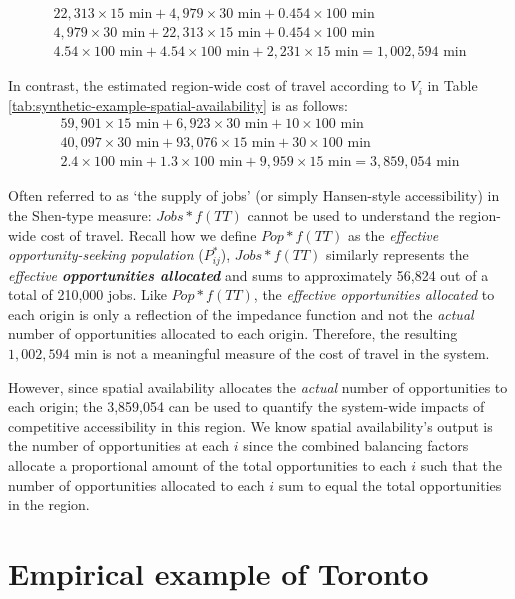\documentclass[]{elsarticle} %
\begin{document}
\[
\begin{array}{l}
22,313\times 15 \text{ min} + 4,979\times 30 \text{ min} + 0.454\times 100 \text{ min}\\
4,979\times 30 \text{ min} + 22,313\times 15 \text{ min} + 0.454\times 100 \text{ min}\\
4.54\times 100 \text{ min} + 4.54\times 100 \text{ min} + 2,231\times 15 \text{ min} = 1,002,594\text{ min}
\end{array}
\]

In contrast, the estimated region-wide cost of travel according to
\(V_i\) in Table \ref{tab:synthetic-example-spatial-availability} is as
follows: \[
\begin{array}{l}
59,901\times 15 \text{ min} + 6,923\times 30 \text{ min} + 10\times 100 \text{ min}\\
40,097\times 30 \text{ min} + 93,076\times 15 \text{ min} + 30\times 100 \text{ min}\\
2.4\times 100 \text{ min} + 1.3\times 100 \text{ min} + 9,959\times 15 \text{ min} = 3,859,054\text{ min}
\end{array}
\]

Often referred to as `the supply of jobs' (or simply Hansen-style
accessibility) in the Shen-type measure: \(Jobs*f(TT)\) cannot be used
to understand the region-wide cost of travel. Recall how we define
\(Pop*f(TT)\) as the \emph{effective opportunity-seeking population}
(\(P^*_{ij}\)), \(Jobs*f(TT)\) similarly represents the \emph{effective
\textbf{opportunities allocated}} and sums to approximately 56,824 out
of a total of 210,000 jobs. Like \(Pop*f(TT)\), the \emph{effective
opportunities allocated} to each origin is only a reflection of the
impedance function and not the \emph{actual} number of opportunities
allocated to each origin. Therefore, the resulting
\(1,002,594\text{ min}\) is not a meaningful measure of the cost of
travel in the system.

However, since spatial availability allocates the \emph{actual} number
of opportunities to each origin; the 3,859,054 can be used to
quantify the system-wide impacts of competitive accessibility in this
region. We know spatial availability's output is the number of
opportunities at each \(i\) since the combined balancing factors
allocate a proportional amount of the total opportunities to each \(i\)
such that the number of opportunities allocated to each \(i\) sum to
equal the total opportunities in the region.

\hypertarget{empirical-example-of-toronto}{%
\section{Empirical example of
Toronto}\label{empirical-example-of-toronto}}
\end{document}
